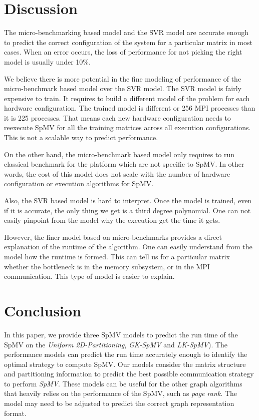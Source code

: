 \documentclass[sigconf,review,anonymous]{acmart}
\begin{document}
\section{Discussion}

The micro-benchmarking based model and the SVR model are accurate
enough to predict the correct configuration of the system for a
particular matrix in most cases. When an error occurs, the loss of
performance for not picking the right model is usually under 10\%.

We believe there is more potential in the fine modeling of performance
of the micro-benchmark based model over the SVR model. The SVR model
is fairly expensive to train. It requires to build a different model
of the problem for each hardware configuration. The trained model is
different or 256 MPI processes than it is 225 processes. That means
each new hardware configuration needs to reexecute SpMV for all the
training matrices across all execution configurations. This is not a
scalable way to predict performance.

On the other hand, the micro-benchmark based model only requires to
run classical benchmark for the platform which are not specific to
SpMV. In other words, the cost of this model does not scale with the
number of hardware configuration or execution algorithms for SpMV.

Also, the SVR based model is hard to interpret. Once the model is
trained, even if it is accurate, the only thing we get is a third
degree polynomial. One can not easily pinpoint from the model why the
execution get the time it gets.

However, the finer model based on micro-benchmarks provides a direct
explanation of the runtime of the algorithm. One can easily understand
from the model how the runtime is formed. This can tell us for a
particular matrix whether the bottleneck is in the memory subsystem,
or in the MPI communication. This type of model is easier to explain.



\section{Conclusion}
In this paper, we provide three SpMV models to predict the run time of the
SpMV on the \textit{Uniform 2D-Partitioning}, \textit{GK-SpMV} and \textit{LK-SpMV}). 
The performance models can predict the run time accurately enough to identify the
optimal strategy to compute SpMV. Our models consider the matrix structure and partitioning information to 
predict the best possible communication strategy to perform
\textit{SpMV}. These models can be useful for the other graph
algorithms that heavily relies on the performance of the SpMV, such as
\textit{page rank}. The model may need to be adjusted to predict the
correct graph representation format.
\end{document}
